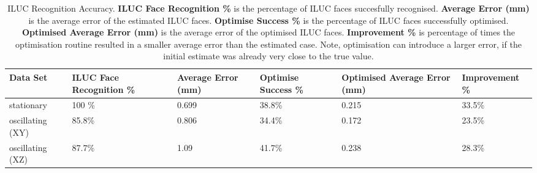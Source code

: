 \begin{table}[H]
    \centering
    \begin{tabular}{|p{1.8cm}||p{1.8cm}|p{1.8cm}|p{1.8cm}|p{1.8cm}|p{2.3cm}|}
    \hline
    \textbf{Data Set} & \textbf{ILUC Face Recognition \%} & \textbf{Average Error (mm)} & \textbf{Optimise Success \%} & \textbf{Optimised Average Error (mm)} & \textbf{Improvement \%} \\
    \hline
    stationary & 100 \% & 0.699 & 38.8\% & 0.215 & 33.5\% \\
    \hline
    oscillating (XY) & 85.8\% & 0.806 & 34.4\% & 0.172 & 23.5\% \\
    \hline
    oscillating (XZ) & 87.7\% & 1.09 & 41.7\% & 0.238 & 28.3\% \\
    \hline
    \end{tabular}
    \caption{ILUC Recognition Accuracy. \textbf{ILUC Face Recognition \%} is the percentage of ILUC faces succesfully recognised. \textbf{Average Error (mm)} is the average error of the estimated ILUC faces. \textbf{Optimise Success \%} is the percentage of ILUC faces successfully optimised. \textbf{Optimised Average Error (mm)} is the average error of the optimised ILUC faces. \textbf{Improvement \%} is percentage of times the optimisation routine resulted in a smaller average error than the estimated case. Note, optimisation can introduce a larger error, if the initial estimate was already very close to the true value.}
    \label{table:iluc_recognition_accuracy}
    \end{table}